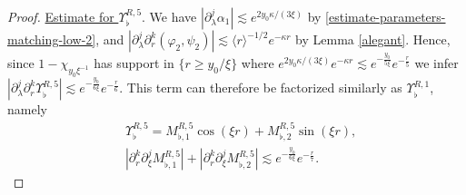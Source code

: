\documentclass[11 pt]{amsart}
\theoremstyle{definition}
\theoremstyle{remark}
\numberwithin{equation}{section}
\begin{document}
\begin{proof}
\smallskip

\noindent \underline{Estimate for $\Upsilon_\flat^{R,5}$}. We have $|\partial_\lambda^j \alpha_1 |\lesssim e^{2y_0\kappa /(3\xi)}$ by \eqref{estimate-parameters-matching-low-2}, and $|\partial_\lambda^j \partial_r^k (\varphi_2 , \psi_2)|\lesssim \langle r \rangle^{-1/2}e^{-\kappa r}$ by Lemma \ref{alegant}. Hence, since $1-\chi_{y_0\xi^{-1}}$ has support in $\{r\geq y_0/\xi\}$ where $e^{2y_0\kappa /(3\xi)} e^{-\kappa r}\lesssim e^{-\frac{y_0}{5\xi}}e^{-\frac{r}{5}}$ we infer $|\partial_\lambda^j \partial_r^k \Upsilon_\flat^{R,5}|\lesssim e^{-\frac{y_0}{6\xi}}e^{-\frac{r}{6}}$. This term can therefore be factorized similarly as $\Upsilon^{R,1}_\flat $, namely
\begin{align}
\nonumber & \Upsilon^{R,5}_\flat=M^{R,5}_{\flat,1}\cos(\xi r)+M^{R,5}_{\flat,2}\sin(\xi r) ,\\
& \label{bd:mflat-inter-5} |\partial_r^k \partial_\xi^j M^{R,5}_{\flat,1}|+|\partial_r^k \partial_\xi^j M^{R,5}_{\flat,2}|\lesssim  e^{-\frac{y_0}{6\xi}}e^{-\frac{r}{7}}.
\end{align}

\smallskip


\end{proof}
\end{document}
